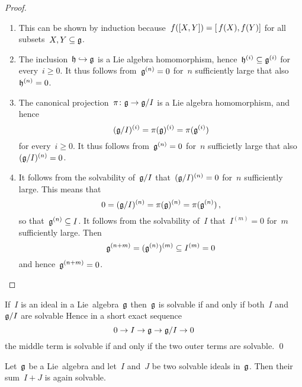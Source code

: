 \begin{proof}
  \leavevmode
  \begin{enumerate}
    \item
      This can be shown by induction because~$f([X,Y]) = [\, f(X), f(Y)]$ for all subsets~$X, Y \subseteq \mathfrak{g}$.
    \item
      The inclusion~$\mathfrak{h} \hookrightarrow \mathfrak{g}$ is a Lie algebra homomorphism, hence~$\mathfrak{h}^{(i)} \subseteq \mathfrak{g}^{(i)}$ for every~$i \geq 0$.
      It thus follows from~$\mathfrak{g}^{(n)} = 0$ for~$n$ sufficiently large that also~$\mathfrak{h}^{(n)} = 0$.
    \item
      The canonical projection~$\pi \colon \mathfrak{g} \to \mathfrak{g}/I$ is a Lie algebra homomorphism, and hence
      \[
        (\mathfrak{g}/I)^{(i)}
        =
        \pi(\mathfrak{g})^{(i)}
        =
        \pi(\mathfrak{g}^{(i)})
      \]
      for every~$i \geq 0$.
      It thus follows from~$\mathfrak{g}^{(n)} = 0$ for~$n$ sufficietly large that also~$(\mathfrak{g}/I)^{(n)} = 0$.
    \item
      It follows from the solvability of~$\mathfrak{g}/I$ that~$(\mathfrak{g}/I)^{(n)} = 0$ for~$n$ sufficiently large.
      This means that
      \[
        0
        =
        (\mathfrak{g}/I)^{(n)}
        =
        \pi(\mathfrak{g})^{(n)}
        =
        \pi(\mathfrak{g}^{(n)})  \,,
      \]
      so that~$\mathfrak{g}^{(n)} \subseteq I$.
      It follows from the solvability of~$I$ that~$I^{(m)} = 0$ for~$m$ sufficiently large.
      Then
      \[
        \mathfrak{g}^{(n+m)}
        =
        (\mathfrak{g}^{(n)})^{(m)}
        \subseteq
        I^{(m)}
        =
        0
      \]
      and hence~$\mathfrak{g}^{(n+m)} = 0$.
    \qedhere
  \end{enumerate}
\end{proof}


\begin{corollary}
  \label{solvable via ses}
  If~$I$ is an ideal in a Lie~algebra~$\mathfrak{g}$ then~$\mathfrak{g}$ is solvable if and only if both~$I$ and~$\mathfrak{g}/I$ are solvable
  Hence in a short exact sequence
  \[
    0
    \to
    I
    \to
    \mathfrak{g}
    \to
    \mathfrak{g}/I
    \to
    0
  \]
  the middle term is solvable if and only if the two outer terms are solvable.
  \qed
\end{corollary}


\begin{corollary}
  \label{sum of solvable ideals is solvable}
  Let~$\mathfrak{g}$ be a Lie~algebra and let~$I$ and~$J$ be two solvable ideals in~$\mathfrak{g}$.
  Then their sum~$I + J$ is again solvable.
\end{corollary}


